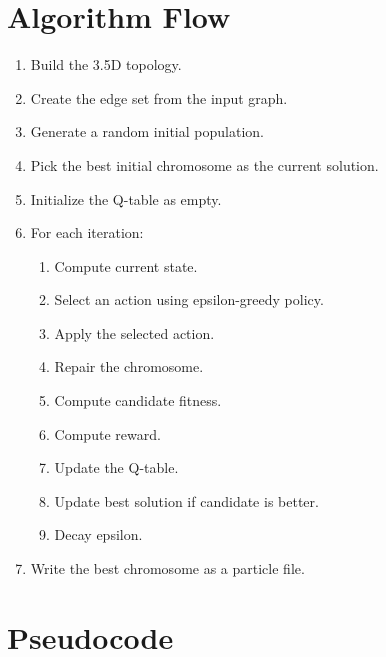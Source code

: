 \documentclass[11pt]{article}
\begin{document}
\section{Algorithm Flow}

\begin{enumerate}
    \item Build the 3.5D topology.
    \item Create the edge set from the input graph.
    \item Generate a random initial population.
    \item Pick the best initial chromosome as the current solution.
    \item Initialize the Q-table as empty.
    \item For each iteration:
    \begin{enumerate}
        \item Compute current state.
        \item Select an action using epsilon-greedy policy.
        \item Apply the selected action.
        \item Repair the chromosome.
        \item Compute candidate fitness.
        \item Compute reward.
        \item Update the Q-table.
        \item Update best solution if candidate is better.
        \item Decay epsilon.
    \end{enumerate}
    \item Write the best chromosome as a particle file.
\end{enumerate}

\section{Pseudocode}
\end{document}
